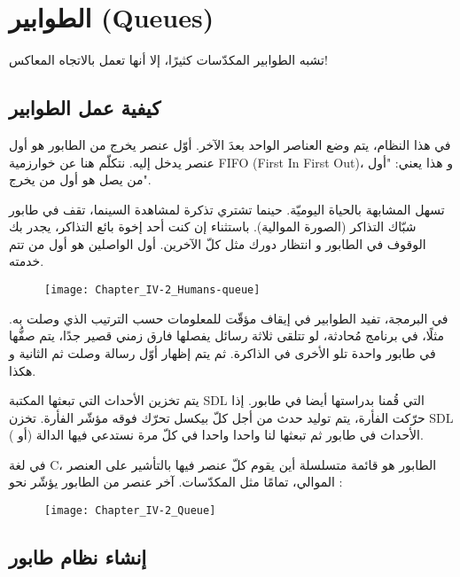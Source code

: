 \section{الطوابير (\textenglish{Queues})}

تشبه الطوابير المكدّسات كثيرًا، إلا أنها تعمل بالاتجاه المعاكس!

\subsection{كيفية عمل الطوابير}

في هذا النظام، يتم وضع العناصر الواحد بعدَ الآخر. أوّل عنصر يخرج من الطابور هو أول عنصر يدخل إليه. نتكلّم هنا عن خوارزمية 
\textenglish{FIFO} (\textenglish{First In First Out})،
و هذا يعني: "أول من يصل هو أول من يخرج".

تسهل المشابهة بالحياة اليوميّة. حينما تشتري تذكرة لمشاهدة السينما، تقف في طابور شبّاك التذاكر (الصورة الموالية). باستثناء إن كنت أحد إخوة بائع التذاكر، يجدر بك الوقوف في الطابور و انتظار دورك مثل كلّ الآخرين. أول الواصلين هو أول من تتم خدمته.

\begin{figure}[H]
	\centering
	\texttt{[image: Chapter\_IV-2\_Humans-queue]}
\end{figure}

 في البرمجة، تفيد الطوابير في إيقاف مؤقّت للمعلومات حسب الترتيب الذي وصلت به. مثلًا، في برنامج مُحادثة، لو تتلقى ثلاثة رسائل يفصلها فارق زمني قصير جدًا، يتم صفُّها في طابور واحدة تلو الأخرى في الذاكرة. ثم يتم إظهار أوّل رسالة وصلت ثم الثانية و هكذا.
 
يتم تخزين الأحداث التي تبعثها المكتبة
\textenglish{SDL}
التي قُمنا بدراستها أيضا في طابور. إذا حرّكت الفأرة، يتم توليد حدث من أجل كلّ بيكسل تحرّك فوقه مؤشّر الفأرة. تخزن \textenglish{SDL}
الأحداث في طابور ثم تبعثها لنا واحدا واحدا في كلّ مرة نستدعي فيها الدالة
(أو
).

في لغة \textenglish{C}،
الطابور هو قائمة متسلسلة أين يقوم كلّ عنصر فيها بالتأشير على العنصر الموالي، تمامًا مثل المكدّسات. آخر عنصر من الطابور يؤشّر نحو
:

\begin{figure}[H]
	\centering
	\texttt{[image: Chapter\_IV-2\_Queue]}
\end{figure}

\subsection{إنشاء نظام طابور}

